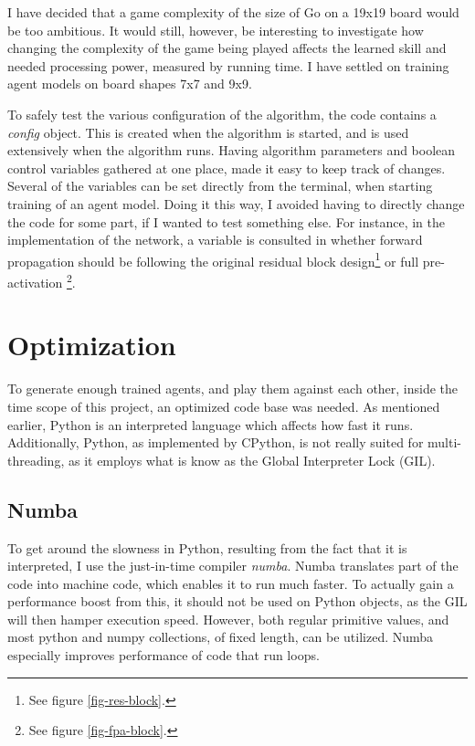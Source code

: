 I have decided that a game complexity of the size of Go on a 19x19 board would be too ambitious. It would still, however, be interesting to investigate how changing the complexity of the game being played affects the learned skill and needed processing power, measured by running time. I have settled on training agent models on board shapes 7x7 and 9x9.

To safely test the various configuration of the algorithm, the code contains a \textit{config} object. This is created when the algorithm is started, and is used extensively when the algorithm runs. Having algorithm parameters and boolean control variables gathered at one place, made it easy to keep track of changes. Several of the variables can be set directly from the terminal, when starting training of an agent model. Doing it this way, I avoided having to directly change the code for some part, if I wanted to test something else. For instance, in the implementation of the network, a variable is consulted in whether forward propagation should be following the original residual block design\footnote{See figure \ref{fig-res-block}.} or full pre-activation \footnote{See figure \ref{fig-fpa-block}.}.

\section{Optimization}
To generate enough trained agents, and play them against each other, inside the time scope of this project, an optimized code base was needed. As mentioned earlier, Python is an interpreted language which affects how fast it runs. Additionally, Python, as implemented by CPython, is not really suited for multi-threading, as it employs what is know as the Global Interpreter Lock (GIL)\cite{GlobalInterpreterLock2017}.

\subsection{Numba}
To get around the slowness in Python, resulting from the fact that it is interpreted, I use the just-in-time compiler \textit{numba}. Numba translates part of the code into machine code, which enables it to run much faster. To actually gain a performance boost from this, it should not be used on Python objects, as the GIL will then hamper execution speed. However, both regular primitive values, and most python and numpy collections, of fixed length, can be utilized. Numba especially improves performance of code that run loops.

